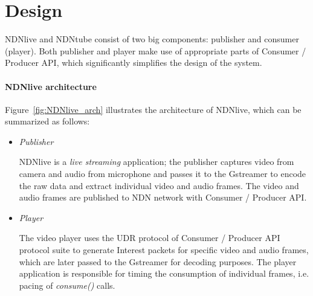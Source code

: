 \vspace{0.3cm}
\section{Design} %
\label{sec:arch}
NDNlive and NDNtube consist of two big components: publisher and consumer (player). Both publisher and player make use of appropriate parts of Consumer / Producer API, which significantly simplifies the design of the system.

\paragraph{NDNlive architecture} %
\vspace{0.3cm}
\label{par:NDNlive_arch}
Figure~\ref{fig:NDNlive_arch} illustrates the architecture of NDNlive, which can be summarized as follows:

\begin{itemize}
  \item \textit{Publisher}

  NDNlive is a \textit{live streaming} application; the publisher captures video from camera and audio from microphone and passes it to the Gstreamer to encode the raw data and extract individual video and audio frames. The video and audio frames are published to NDN network with Consumer / Producer API. 

  \item \textit{Player}

  The video player uses the UDR protocol of Consumer / Producer API protocol suite to generate Interest packets for specific video and audio frames, which are later passed to the Gstreamer for decoding purposes. The player application is responsible for timing the consumption of individual frames, i.e. pacing of \textit{consume()} calls.

\end{itemize}

